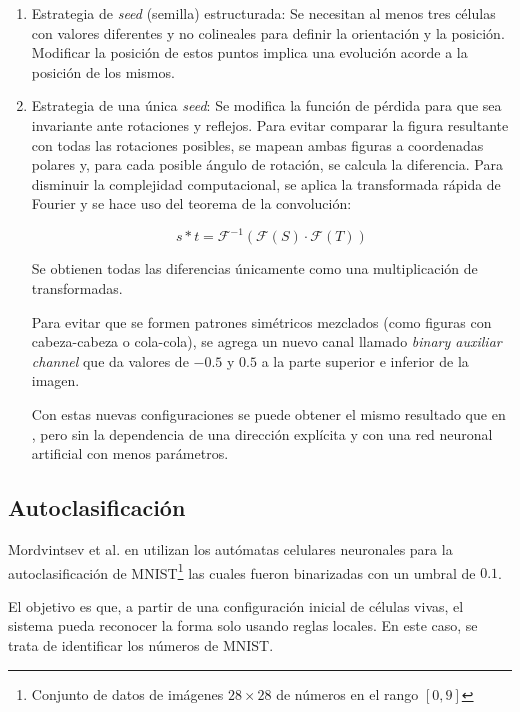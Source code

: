 \begin{enumerate}
	
	\item Estrategia de \textit{seed} (semilla) estructurada: Se necesitan al menos tres células con valores diferentes y no colineales para definir la orientación y la posición. Modificar la posición de estos puntos implica una evolución acorde a la posición de los mismos.
	
	\item Estrategia de una única \textit{seed}: Se modifica la función de pérdida para que sea invariante ante rotaciones y reflejos. Para evitar comparar la figura resultante con todas las rotaciones posibles, se mapean ambas figuras a coordenadas polares y, para cada posible ángulo de rotación, se calcula la diferencia. Para disminuir la complejidad computacional, se aplica la transformada rápida de Fourier y se hace uso del teorema de la convolución:
	
	\[
	s * t = \mathcal{F}^{-1} (\mathcal{F}(S) \cdot \mathcal{F}(T)) 
	\]
	
	Se obtienen todas las diferencias únicamente como una multiplicación de transformadas.
	
	
	
	Para evitar que se formen patrones simétricos mezclados (como figuras con cabeza-cabeza o cola-cola), se agrega un nuevo canal llamado \textit{binary auxiliar channel} que da valores de $-0.5$ y $0.5$ a la parte superior e inferior de la imagen.
	
	
	
	Con estas nuevas configuraciones se puede obtener el mismo resultado que en \cite{mordvintsevNCA}, pero sin la dependencia de una dirección explícita y con una red neuronal artificial con menos parámetros.
	
\end{enumerate}

\subsection{Autoclasificación}

Mordvintsev et al. en \cite{MNIST} utilizan los autómatas celulares neuronales para la autoclasificación de MNIST\footnote{Conjunto de datos de imágenes $28 \times 28$ de números en el rango $[0,9]$} las cuales fueron binarizadas con un umbral de $0.1$. 

El objetivo es que, a partir de una configuración inicial de células vivas, el sistema pueda reconocer la forma solo usando reglas locales. En este caso, se trata de identificar los números de MNIST.

